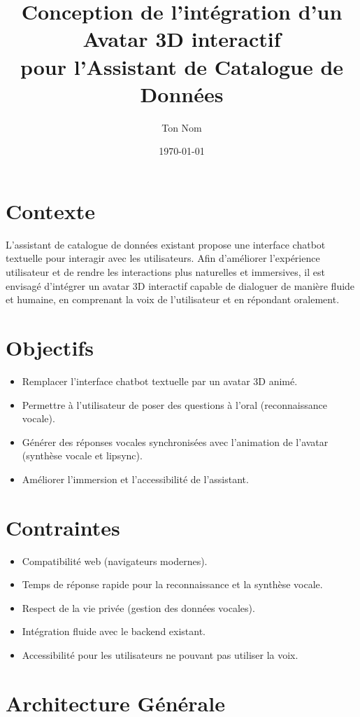 \documentclass[a4paper,12pt]{article}
\title{Conception de l'intégration d'un Avatar 3D interactif\\
pour l'Assistant de Catalogue de Données}
\author{Ton Nom}
\date{\today}
\begin{document}
\maketitle

\section{Contexte}
L’assistant de catalogue de données existant propose une interface chatbot textuelle pour interagir avec les utilisateurs. Afin d’améliorer l’expérience utilisateur et de rendre les interactions plus naturelles et immersives, il est envisagé d’intégrer un avatar 3D interactif capable de dialoguer de manière fluide et humaine, en comprenant la voix de l’utilisateur et en répondant oralement.

\section{Objectifs}
\begin{itemize}
    \item Remplacer l’interface chatbot textuelle par un avatar 3D animé.
    \item Permettre à l’utilisateur de poser des questions à l’oral (reconnaissance vocale).
    \item Générer des réponses vocales synchronisées avec l’animation de l’avatar (synthèse vocale et lipsync).
    \item Améliorer l’immersion et l’accessibilité de l’assistant.
\end{itemize}

\section{Contraintes}
\begin{itemize}
    \item Compatibilité web (navigateurs modernes).
    \item Temps de réponse rapide pour la reconnaissance et la synthèse vocale.
    \item Respect de la vie privée (gestion des données vocales).
    \item Intégration fluide avec le backend existant.
    \item Accessibilité pour les utilisateurs ne pouvant pas utiliser la voix.
\end{itemize}

\section{Architecture Générale}
\end{document}
